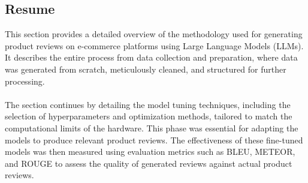 \subsection{Resume}
This section provides a detailed overview of the methodology used for generating product reviews on e-commerce platforms using Large Language Models (LLMs). It describes the entire process from data collection and preparation, where data was generated from scratch, meticulously cleaned, and structured for further processing.
\\\\
The section continues by detailing the model tuning techniques, including the selection of hyperparameters and optimization methods, tailored to match the computational limits of the hardware. This phase was essential for adapting the models to produce relevant product reviews. The effectiveness of these fine-tuned models was then measured using evaluation metrics such as BLEU, METEOR, and ROUGE to assess the quality of generated reviews against actual product reviews.